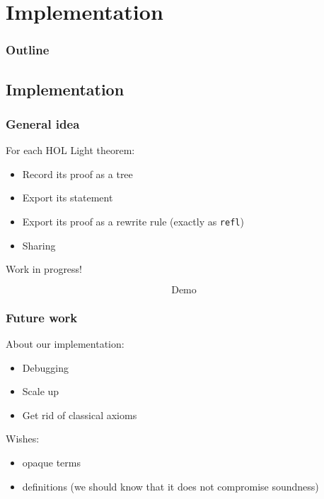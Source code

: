 \section{Implementation}

\begin{frame}
\frametitle{Outline}

\tableofcontents[currentsection]
\end{frame}


\subsection{Implementation}

\begin{frame}
\frametitle{General idea}

\begin{block}{For each HOL Light theorem:}
  \begin{itemize}
  \item Record its proof as a tree
  \item Export its statement
  \item Export its proof as a rewrite rule (exactly as \lstinline!refl!)
  \item Sharing
  \end{itemize}
\end{block}

Work in progress!

\pause

\alert{$$\boxed{\text{Demo}}$$}

\end{frame}


\begin{frame}
\frametitle{Future work}

\begin{block}{About our implementation:}
  \begin{itemize}
  \item Debugging
  \item Scale up
  \item Get rid of classical axioms
  \end{itemize}
\end{block}

\begin{block}{Wishes:}
\begin{itemize}
\item opaque terms
\item definitions (we should know that it does not compromise soundness)
\end{itemize}
\end{block}

\end{frame}






